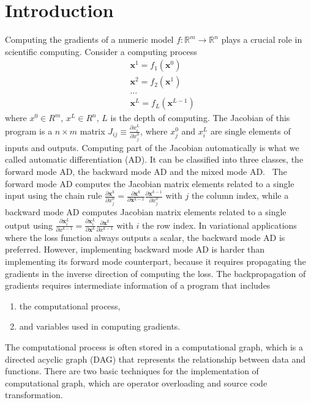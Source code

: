 \documentclass{article}
\newcommand{\<}{\langle}
\renewcommand{\>}{\rangle}
\newcommand{\vx}{{\mathbf{x}}}
\theoremstyle{definition}\newtheorem{definition}{\textit{Definition}}
\begin{document}
\section{Introduction}\label{sec:intro}
    Computing the gradients of a numeric model $f : \mathbb{R}^m \rightarrow \mathbb{R}^n$ plays a crucial role in scientific computing. Consider a computing process
\begin{align*}
    &\vx^1 = f_1(\vx^0)\\
    &\vx^2 = f_2(\vx^1)\\
    &\ldots\\
    &\vx^L = f_L(\vx^{L-1})
\end{align*}
where $x^0\in R^m$, $x^L\in R^n$, $L$ is the depth of computing.
The Jacobian of this program is a $n\times m$ matrix $J_{ij} \equiv \frac{\partial x^L_i}{\partial x_j^0}$, where $x_j^0$ and $x_i^L$ are single elements of inputs and outputs.
Computing part of the Jacobian automatically is what we called automatic differentiation (AD). It can be classified into three classes, the forward mode AD, the backward mode AD and the mixed mode AD.~\cite{Hascoet2013}
    The forward mode AD computes the Jacobian matrix elements related to a single input using the chain rule $\frac{\partial \vx^k}{\partial x^0_j} = \frac{\partial \vx^k}{\partial \vx^{k-1}}\frac{\partial \vx^{k-1}}{\partial x^0_j}$ with $j$ the column index, while a backward mode AD computes Jacobian matrix elements related to a single output using $\frac{\partial \vx^L_i}{\partial x^{k-1}} = \frac{\partial \vx^L_i}{\partial \vx^{k}}\frac{\partial \vx^{k}}{\partial x^{k-1}}$ with $i$ the row index.
    In variational applications where the loss function always outputs a scalar, the backward mode AD is preferred.
However, implementing backward mode AD is harder than implementing its forward mode counterpart, because it requires propagating the gradients in the inverse direction of computing the loss. The backpropagation of gradients requires intermediate information of a program that includes
\begin{enumerate}
    \item the computational process,
    \item and variables used in computing gradients.
\end{enumerate}
    The computational process is often stored in a computational graph, which is a directed acyclic graph (DAG) that represents the relationship between data and functions.
    There are two basic techniques for the implementation of computational graph, which are operator overloading and source code transformation.
\end{document}
